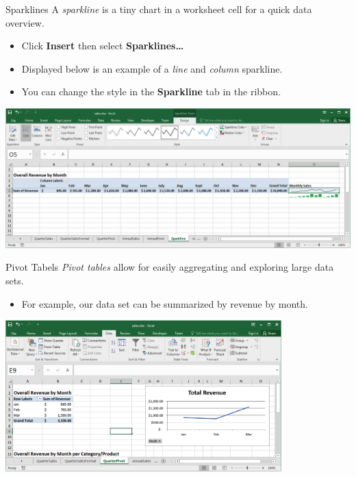 \documentclass[xcolor=svgnames]{beamer}
\begin{document}
\begin{frame}{Sparklines}
A \emph{sparkline} is a tiny chart in a worksheet cell for a quick data overview.
\begin{itemize}
\item Click {\bf Insert} then select {\bf Sparklines\dots} 
\item Displayed below is an example of a \textit{line} and \textit{column} sparkline.
\item You can change the style in the {\bf Sparkline} tab in the ribbon.
\end{itemize}
 \begin{center}
        \includegraphics[width=.9\textwidth]{Sparklines}
 \end{center}
\end{frame}





\begin{frame}{Pivot Tabels}
\emph{Pivot tables} allow for easily aggregating and exploring large data sets.\\[1em]
\begin{itemize}
\item For example, our data set can be summarized by revenue by month.
\end{itemize}
\begin{center}
\includegraphics[width=0.8\textwidth]{pivot}
\end{center}
\end{frame}
\end{document}
